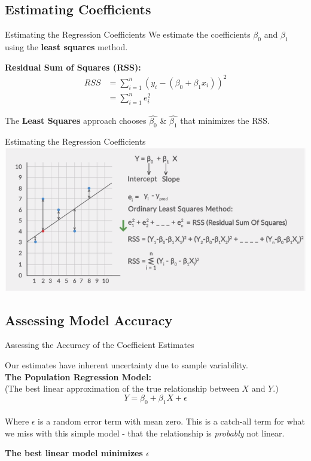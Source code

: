 \documentclass[aspectratio=169,xcolor=dvipsnames]{beamer}
\begin{document}
\subsection{Estimating Coefficients}
\begin{frame}{Estimating the Regression Coefficients}
    We estimate the coefficients \( \beta_0 \) and \( \beta_1 \) using the \textbf{least squares} method.
    
    \bigskip
    
    \textbf{Residual Sum of Squares (RSS):}
    {\large\begin{align}
        RSS &= \sum_{i=1}^{n} (y_i - (\beta_0 + \beta_1 x_i))^2 \\
        &= \sum_{i=1}^{n} e_i^2
    \end{align}}
    
    \bigskip
    
    The \textbf{Least Squares} approach chooses $\hat{\beta_0}$ \& $\hat{\beta_1}$ that minimizes the RSS.
\end{frame}

\begin{frame}{Estimating the Regression Coefficients}
\centering
\includegraphics[scale=0.5]{images/RSS.png}

\end{frame}
\subsection{Assessing Model Accuracy}
\begin{frame}{Assessing the Accuracy of the Coefficient Estimates}

Our estimates have inherent uncertainty due to sample variability. \\
\bigskip
    \textbf{The Population Regression Model:} \\
    (The best linear approximation of the true relationship between $X$ and $Y$.)
    {\Large\begin{equation}
        Y = \beta_0 + \beta_1 X + \epsilon
    \end{equation}} \\
    Where \( \epsilon \) is a random error term with mean zero. This is a catch-all term for what we miss with this simple model - that the relationship is \textit{probably} not linear.

    \bigskip
    \textbf{The best linear model minimizes $\epsilon$}
    
\end{frame}
\end{document}
